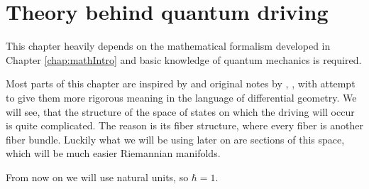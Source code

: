 \chapter{Theory behind quantum driving}
\label{chap:driving}
This chapter heavily depends on the mathematical formalism developed in Chapter \ref{chap:mathIntro} and basic knowledge of quantum mechanics is required.

Most parts of this chapter are inspired by \citet{kolodrubez} and original notes by \citet{berry1984}, \citet{berry1989}, \citet{berry2009} with attempt to give them more rigorous meaning in the language of differential geometry. We will see, that the structure of the space of states on which the driving will occur is quite complicated. The reason is its fiber structure, where every fiber is another fiber bundle. Luckily what we will be using later on are sections of this space, which will be much easier Riemannian manifolds. 

From now on we will use natural units, so $\hbar=1$.




